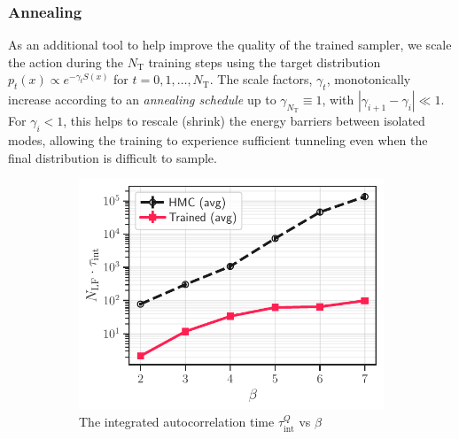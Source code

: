 \documentclass[a4paper,11pt]{article}
\begin{document}
\subsubsection{\label{subsubsec:annealing}Annealing}
As an additional tool to help improve the quality of the trained sampler, we
scale the action during the $N_{\mathrm{T}}$ training steps using the target
distribution \(p_{t}(x) \propto e^{-\gamma_{t} S(x)}\)
for \(t = 0, 1, \ldots, N_{\mathrm{T}}\).
The scale factors, $\gamma_{t}$, monotonically increase according to
an \emph{annealing schedule} up to $\gamma_{N_{\mathrm{T}}} \equiv 1$,
with \(|\gamma_{i+1} - \gamma_{i}| \ll 1\).
%
For \(\gamma_i < 1\), this helps to rescale (shrink) the energy
barriers between isolated modes, allowing the training to experience
sufficient tunneling even when the final distribution is difficult to
sample.
%
\begin{figure}[htpb]
    \centering
    \begin{subfigure}[b]{0.47\textwidth}
        \includegraphics[width=\textwidth]{assets/autocorr_vs_beta.pdf}
        \caption{\label{fig:autocorr} The integrated autocorrelation
        time \(\tau_{\mathrm{int}}^{Q}\) vs \(\beta\)}
    \end{subfigure}
    \hfill
    \begin{subfigure}[b]{0.49\textwidth}

\end{subfigure}
\end{figure}
\end{document}
